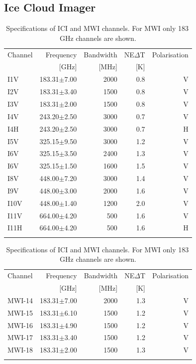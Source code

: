 \documentclass[amt, manuscript]{copernicus}
\begin{document}
\subsection{Ice Cloud Imager}
%
\begin{table}[t]	
	\caption{Specifications of ICI and MWI channels. For MWI only 183\,GHz channels are shown.}
	\label{tab:ICI_MWI_channels}
	\begin{tabular}{lrrrr}
		\tophline
		Channel & Frequency 	& Bandwidth  	&NE$\Delta$T	&Polarisation\\
				& [GHz]			& [MHz]			& [K]			&\\
		\middlehline
		I1V&	183.31$\pm$7.00    & 2000 			& 0.8 		& V\\
		I2V&	183.31$\pm$3.40    & 1500 			& 0.8 		& V\\
		I3V&	183.31$\pm$2.00    & 1500			& 0.8 		& V\\
		I4V&	243.20$\pm$2.50    & 3000			& 0.7 		& V\\
		I4H&	243.20$\pm$2.50    & 3000			& 0.7 		& H\\
		I5V&	325.15$\pm$9.50    & 3000			& 1.2 		& V\\
		I6V&	325.15$\pm$3.50    & 2400			& 1.3 		& V\\
		I6V&	325.15$\pm$1.50    & 1600			& 1.5 		& V\\
		I8V&	448.00$\pm$7.20    & 3000			& 1.4 		& V\\
		I9V&	448.00$\pm$3.00    & 2000			& 1.6 		& V\\
		I10V&	448.00$\pm$1.40    & 1200			& 2.0 		& V\\
		I11V&	664.00$\pm$4.20    & \phantom{0}500			& 1.6 		& V\\
		I11H&	664.00$\pm$4.20    & \phantom{0}500 			& 1.6 		& H\\		
		\bottomhline
	\end{tabular}
	\begin{tabular}{lrrrr}
		\tophline
		Channel & Frequency 	& Bandwidth  	&NE$\Delta$T	&Polarisation\\
				& [GHz]			& [MHz]			& [K]			&\\
		\middlehline
		MWI-14&	183.31$\pm$7.00    & 2000 			& 1.3 		& V\\
		MWI-15&	183.31$\pm$6.10    & 1500			& 1.2 		& V\\
		MWI-16&	183.31$\pm$4.90    & 1500			& 1.2 		& V\\
		MWI-17&	183.31$\pm$3.40    & 1500			& 1.2 		& V\\
		MWI-18&	183.31$\pm$2.00    & 1500			& 1.3 		& V\\	
		\bottomhline
	\end{tabular}

	\belowtable{} %
\end{table}
\end{document}
